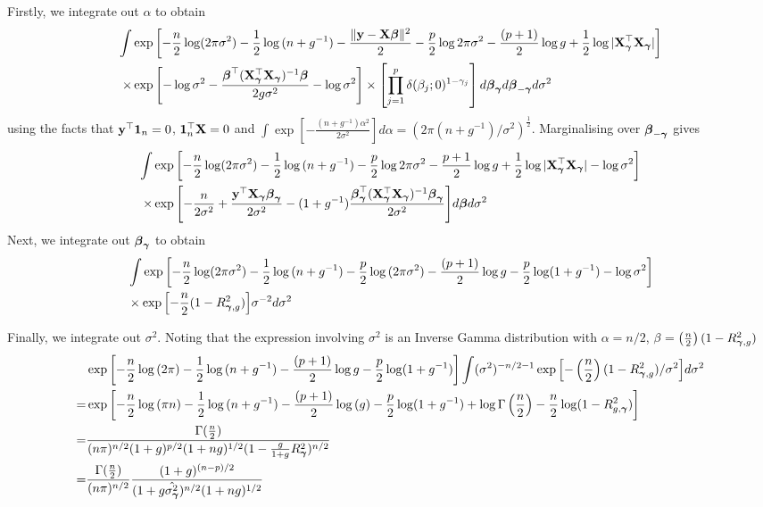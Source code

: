 \documentclass{amsart}[12pt]
\theoremstyle{definition}
\begin{document}
\noindent Firstly, we integrate out $\alpha$ to obtain
\begin{align*}
		\int & \exp{\left[-\frac{n}{2} \log (2 \pi \sigma^2) - \frac{1}{2} \log{(n + g^{-1})} - \frac{\|{\bf y}- {\bf X}{\boldsymbol\beta}\|^2}{2} 
		-\frac{p}{2} \log{2\pi \sigma^2} - \frac{(p + 1)}{2} \log{g} + \frac{1}{2} \log{|{\bf X}_{\boldsymbol\gamma}^\top {\bf X}_{\boldsymbol\gamma}|} \right]}\\
		\times&\exp{\left[- \log{\sigma^2} - \frac{{\boldsymbol\beta}^\top ({\bf X}_{\boldsymbol\gamma}^\top {\bf X}_{\boldsymbol\gamma})^{-1} {\boldsymbol\beta}}{2 g \sigma^{2}} - \log{\sigma^2}\right]} 
		\times \left[ \prod_{j=1}^p \delta(\beta_j; 0)^{1 - \gamma_j} \right] d {\boldsymbol \beta}_{{\boldsymbol \gamma}} d {\boldsymbol \beta}_{-{\boldsymbol \gamma}} d \sigma^2
\end{align*}
using the facts that ${\bf y}^\top {\bf1}_n = 0$, ${\bf 1}_n^\top {\bf X} = 0$ and $\int \exp{\left[-\frac{(n + g^{-1})\alpha^2}{2 \sigma^{2}} \right]} d \alpha = (2 \pi (n + g^{-1}) / \sigma^{2})^{\frac{1}{2}}$.
Marginalising over ${\boldsymbol \beta}_{-{\boldsymbol \gamma}}$ gives
\begin{align*}
		\int &\exp{\left[-\frac{n}{2} \log (2 \pi \sigma^2) - \frac{1}{2} \log{(n + g^{-1})}
		-\frac{p}{2} \log{2\pi \sigma^2} - \frac{p + 1}{2} \log{g}
		+ \frac{1}{2} \log{|{\bf X}_{\boldsymbol\gamma}^\top {\bf X}_{\boldsymbol\gamma}|} - \log{\sigma^2} \right]} \\
		\times&\exp{\left[- \frac{n}{2 \sigma^2}+ \frac{{\bf y}^\top{\bf X}_{\boldsymbol\gamma}{\boldsymbol\beta}_{\boldsymbol\gamma}}{2 \sigma^2} - (1 + g^{-1})\frac{{\boldsymbol\beta}_{\boldsymbol\gamma}^\top ({\bf X}_{\boldsymbol\gamma}^\top {\bf X}_{\boldsymbol\gamma})^{-1} {\boldsymbol\beta}_{\boldsymbol\gamma}}{2 \sigma^{2}} \right]} d {\boldsymbol \beta} d \sigma^2
\end{align*}
\noindent Next, we integrate out ${\boldsymbol \beta}_{{\boldsymbol \gamma}}$ to obtain
\begin{align*}
		& \int \exp{\left[-\frac{n}{2} \log (2 \pi \sigma^2) - \frac{1}{2} \log{(n + g^{-1})}
		-\frac{p}{2} \log{(2\pi \sigma^2)} - \frac{(p + 1)}{2} \log{g} - \frac{p}{2} \log (1 + g^{-1}) -\log{\sigma^2} \right]} \\
		&\times \exp{\left[-\frac{n}{2} (1 - R^2_{{\boldsymbol\gamma}, g})\right]} \sigma^{-2}
		d \sigma^2
\end{align*}

\noindent Finally, we integrate out $\sigma^2$. Noting that the expression involving $\sigma^2$ is an
Inverse Gamma distribution with $\alpha = n/2$, $\beta = \left(\frac{n}{2}\right) (1 - R^2_{{\boldsymbol \gamma}, g})$
\begin{align*}
		& \exp{\left[-\frac{n}{2} \log{(2 \pi)} -\frac{1}{2} \log{(n + g^{-1})}
		- \frac{(p + 1)}{2} \log{g} - \frac{p}{2} \log (1 + g^{-1}) \right]}
		 \int (\sigma^{2})^{-n/2 - 1} \exp{\left[-\left(\frac{n}{2}\right) (1 - R^2_{{\boldsymbol\gamma}, g}) / \sigma^{2}\right]} d \sigma^2 \\
		= &\exp{\left[-\frac{n}{2} \log{(\pi n)} - \frac{1}{2} \log{(n + g^{-1})}
		- \frac{(p + 1)}{2} \log{(g)} - \frac{p}{2} \log (1 + g^{-1})
		+ \log \Gamma\left(\frac{n}{2}\right) - \frac{n}{2} \log(1 - R^2_{g, {\boldsymbol\gamma}}) \right]} \\
		= &\frac{\Gamma(\frac{n}{2})}{(n \pi)^{n/2} (1 + g)^{p/2} (1 + ng)^{1/2} (1 - \frac{g}{1 + g} R^2_{\boldsymbol \gamma})^{n/2}} \\
		= &\frac{\Gamma(\frac{n}{2})}{(n \pi)^{n/2}} \frac{(1 + g)^{(n-p)/2}}{(1 + g \hat{\sigma^2_{\boldsymbol \gamma}})^{n/2} (1 + ng)^{1/2}}
\end{align*}
\end{document}
